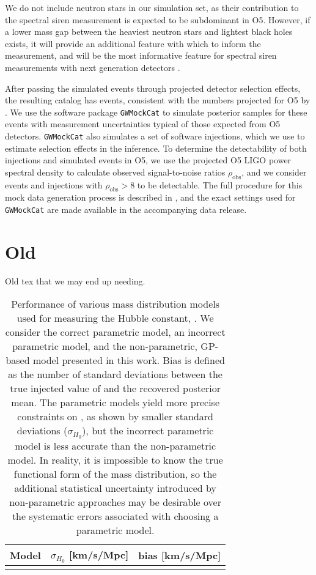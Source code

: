 \documentclass[]{aastex631}
\begin{document}
We do not include neutron stars in our simulation set, as their contribution to the spectral siren measurement is expected to be subdominant in \ac{O5}.
However, if a lower mass gap between the heaviest neutron stars and lightest black holes exists, it will provide an additional feature with which to inform the measurement, and will be the most informative feature for spectral siren measurements with next generation detectors \citep{ezquiaga_spectral_2022}.

After passing the simulated events through projected detector selection effects, the resulting catalog has events, consistent with the numbers projected for \ac{O5} by \citet{kiendrebogo_observing_2023}.
We use the software package \texttt{GWMockCat} \citep{farah_things_2023} to simulate posterior samples for these events with measurement uncertainties typical of those expected from \ac{O5} detectors.
\texttt{GWMockCat} also simulates a set of software injections, which we use to estimate selection effects in the inference.
To determine the detectability of both injections and simulated events in O5, we use the projected \ac{O5} LIGO power spectral density \citep{dccpage} to calculate observed signal-to-noise ratios $\rho_{\text{obs}}$, and we consider events and injections with $\rho_{\text{obs}}>8$ to be detectable. 
The full procedure for this mock data generation process is described in \citet{fishbach_where, farah_things_2023, essick_dagnabbit_2023}, and the exact settings used for \texttt{GWMockCat} are made available in the accompanying data release.

\section{Old}
Old tex that we may end up needing.

\begin{table}[]
    \centering
    \begin{tabular}{c|c c}
         Model & $\sigma_{H_0}$ [km/s/Mpc] & bias [km/s/Mpc]\\
         \hline
         & 
    \end{tabular}
    \caption{Performance of various mass distribution models used for measuring the Hubble constant, \Ho.
    We consider the correct parametric model, an incorrect parametric model, and the non-parametric, \ac{GP}-based model presented in this work.
    Bias is defined as the number of standard deviations between the true injected value of \Ho and the recovered posterior mean. 
    The parametric models yield more precise constraints on \Ho{}, as shown by smaller standard deviations ($\sigma_{H_0}$), but the incorrect parametric model is less accurate than the non-parametric model.
    In reality, it is impossible to know the true functional form of the mass distribution, so the additional statistical uncertainty introduced by non-parametric approaches may be desirable over the systematic errors associated with choosing a parametric model.
    }
    \label{tab:bias}
\end{table}
\end{document}
